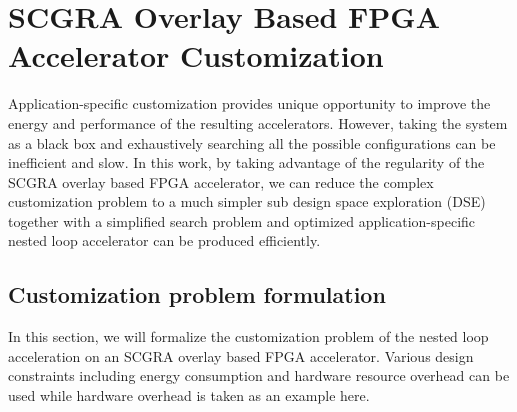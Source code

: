 \section{SCGRA Overlay Based FPGA Accelerator Customization} \label{sec:customization-framework}
Application-specific customization provides unique opportunity to improve 
the energy and performance of the resulting accelerators. However, 
taking the system as a black box and exhaustively searching all the 
possible configurations can be inefficient and slow. In this work, by taking advantage 
of the regularity of the SCGRA overlay based FPGA accelerator, we 
can reduce the complex customization problem to a much simpler sub design space exploration (DSE)
together with a simplified search problem and optimized application-specific 
nested loop accelerator can be produced efficiently.

\subsection{Customization problem formulation}
In this section, we will formalize the customization problem of the nested loop acceleration on an
SCGRA overlay based FPGA accelerator. Various design constraints including energy consumption and
hardware resource overhead can be used while hardware overhead is taken as an example here.

